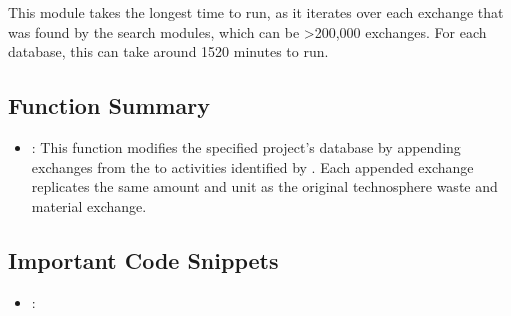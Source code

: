 \documentclass[letterpaper,10pt,english]{sphinxmanual}
\begin{document}
\sphinxAtStartPar
This module takes the longest time to run, as it iterates over each exchange that was found by the search modules, which can be \textgreater{}200,000 exchanges. For each database, this can take around 15\sphinxhyphen{}20 minutes to run.


\subsection{Function Summary}
\label{\detokenize{ExchangeEditor:function-summary}}\begin{itemize}
\item {} 
\sphinxAtStartPar
{}: This function modifies the specified project’s database by appending exchanges from the
 to activities identified by . Each appended exchange replicates the same amount and unit as the original technosphere waste and material exchange.

\end{itemize}


\subsection{Important Code Snippets}
\label{\detokenize{ExchangeEditor:important-code-snippets}}\begin{itemize}
\item {} 
\sphinxAtStartPar
{}:

\end{itemize}
\end{document}
